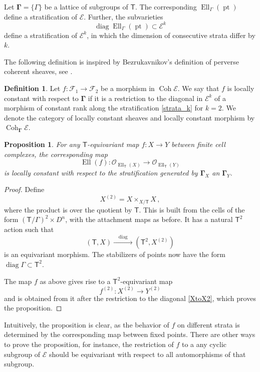 \documentclass[14pt]{extarticle}
\newcommand{\bT}{\mathsf{T}}
\newcommand{\cF}{\mathscr{F}}
\newcommand{\cE}{\mathscr{E}}
\newcommand{\bGamma}{\boldsymbol{\Gamma}}
\newcommand{\cO}{\mathscr{O}}
\DeclareMathOperator{\Coh}{Coh}
\DeclareMathOperator{\Ell}{Ell}
\DeclareMathOperator{\pt}{pt}
\DeclareMathOperator{\diag}{diag}
\newtheorem{Proposition}[Lemma]{Proposition}
\theoremstyle{definition}
\newtheorem{Definition}{Definition}
\begin{document}
Let $\bGamma = \{ \Gamma \}$ be a lattice of subgroups of
$\bT$. The corresponding $\Ell_\Gamma(\pt)$ define a stratification of
$\cE$. Further, the subvarieties
%
\begin{equation}
\diag \Ell_\Gamma(\pt)  \subset \cE^k\label{strata_k}
\end{equation}
%
define a stratification of $\cE^k$, in which the dimension of
consecutive strata differ by $k$.

The following definition is inspired by Bezrukavnikov's definition of
perverse coherent sheaves, see \cite{ArinkBezr}. 

\begin{Definition}
Let $f: \cF_1 \to \cF_2$ be a morphism in $\Coh \cE$. We say that $f$
is locally constant with respect to $\bGamma$ if it is a restriction
to the diagonal in $\cE^k$ of a morphism of constant rank along the stratification
\eqref{strata_k} for $k=2$.  We denote the category of locally constant
sheaves and locally constant morphism by $\Coh_{\bGamma} \cE$. 
\end{Definition}

\begin{Proposition}
For any $\bT$-equivariant map
$
f: X \to Y
$
between finite cell complexes, the corresponding map
$$
\Ell(f): \cO_{\Ell_\bT(X)} \to \cO_{\Ell_\bT(Y)} 
$$
is locally constant with respect to the stratification generated by
$\bGamma_X$ an $\bGamma_Y$. 
\end{Proposition}

\begin{proof}
  Define
  $$
  X^{(2)} = X \times_{X/\bT} X\,, 
  $$
  where the product is over the quotient by $\bT$. This is built from
  the cells of the form $(\bT/\Gamma)^2 \times D^n$, with the
  attachment maps as before. 
  It has a natural $\bT^2$ action such that
  \begin{equation}
  (\bT, X) \xrightarrow{\quad \diag \quad} (\bT^2, X^{(2)})
\label{XtoX2}
\end{equation}
%
is an equivariant morphism. The stabilizers of points now have the
form $\diag \Gamma \subset \bT^2$. 
  
  The map $f$ as above gives rise to a  $\bT^2$-equivariant map
  $$
  f^{(2)}:   X^{(2)} \to  Y^{(2)} 
  $$
  and is obtained from it after the restriction to the diagonal
  \eqref{XtoX2}, which proves the proposition. 
\end{proof}

Intuitively, the proposition is clear, as the behavior of $f$ on
different strata is determined by the corresponding map between fixed
points. There are other ways to prove the proposition, for instance,
the restriction of $f$ to a any cyclic subgroup of $\cE$ should be
equivariant with respect to all automorphisms of that subgroup.
\end{document}
